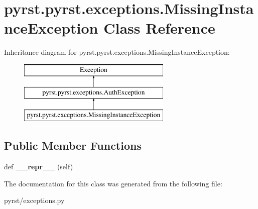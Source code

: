 \hypertarget{classpyrst_1_1pyrst_1_1exceptions_1_1_missing_instance_exception}{}\section{pyrst.\+pyrst.\+exceptions.\+Missing\+Instance\+Exception Class Reference}
\label{classpyrst_1_1pyrst_1_1exceptions_1_1_missing_instance_exception}
Inheritance diagram for pyrst.\+pyrst.\+exceptions.\+Missing\+Instance\+Exception\+:\begin{figure}[H]
\begin{center}
\leavevmode
\includegraphics[height=3.000000cm]{classpyrst_1_1pyrst_1_1exceptions_1_1_missing_instance_exception}
\end{center}
\end{figure}
\subsection*{Public Member Functions}
\begin{DoxyCompactItemize}
\item 
\hypertarget{classpyrst_1_1pyrst_1_1exceptions_1_1_missing_instance_exception_aae1a4694bead8963b736aef0c884fd90}{}def {\bfseries \+\_\+\+\_\+repr\+\_\+\+\_\+} (self)\label{classpyrst_1_1pyrst_1_1exceptions_1_1_missing_instance_exception_aae1a4694bead8963b736aef0c884fd90}

\end{DoxyCompactItemize}


The documentation for this class was generated from the following file\+:\begin{DoxyCompactItemize}
\item 
pyrst/exceptions.\+py\end{DoxyCompactItemize}
